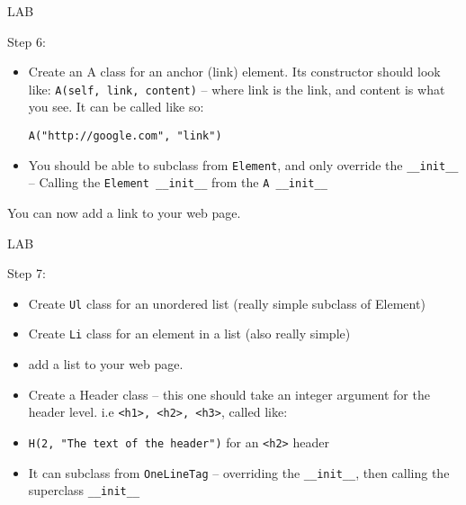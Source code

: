 \documentclass{beamer}
\begin{document}
\begin{frame}[fragile]{LAB}

{\Large Step 6:}

\begin{itemize}
   \item  Create an A class for an anchor (link) element. Its constructor should
          look like: \verb|A(self, link, content)| -- where link is the link,
          and content is what you see. It can be called like so:

   
   \verb|A("http://google.com", "link")|

  \item You should be able to subclass from \verb|Element|, and only override
        the \verb|__init__|\\
        -- Calling the \verb|Element __init__| from the  \verb|A __init__|
\end{itemize}

\vfill
    You can now add a link to your web page.
\end{frame}

\begin{frame}[fragile]{LAB}

{\Large Step 7:}

\begin{itemize}
   \item Create \verb|Ul| class for an unordered list (really simple subclass of Element)
   
   \item Create \verb|Li| class for an element in a list (also really simple)
   
   \item add a list to your web page.
   
   \item Create a Header class -- this one should take an integer argument for the
   header level. i.e \verb|<h1>, <h2>, <h3>|, called like:
   
   \item \verb|H(2, "The text of the header")| for an \verb|<h2>| header
   
   \item It can subclass from \verb|OneLineTag| -- overriding the \verb|__init__|, then calling
       the superclass \verb|__init__|
\end{itemize}

\end{frame}
\end{document}
